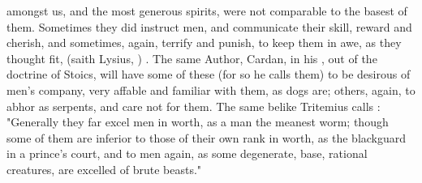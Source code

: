 amongst us, and the most generous spirits, were not comparable to the basest of
them. Sometimes they did instruct men, and communicate their skill, reward and
cherish, and sometimes, again, terrify and punish, to keep them in awe, as they
thought fit,  (saith Lysius,
) . The same Author, Cardan, in his
, out of the doctrine of Stoics, will have some
of these  (for so he calls them) to be desirous
of men's company, very affable and familiar with them, as dogs are; others,
again, to abhor as serpents, and care not for them. The same belike Tritemius
calls : "Generally they far
excel men in worth, as a man the meanest worm; though some of them are inferior
to those of their own rank in worth, as the blackguard in a prince's court, and
to men again, as some degenerate, base, rational creatures, are excelled of
brute beasts."

